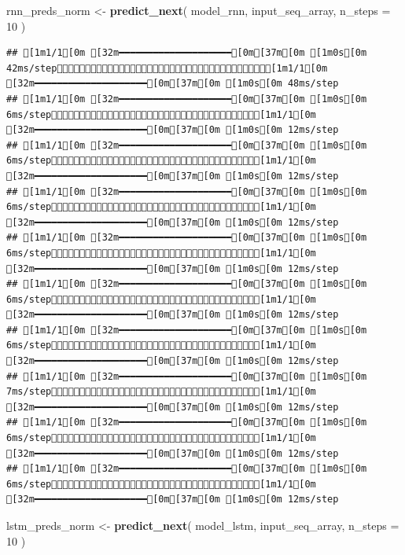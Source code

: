 \documentclass[
]{article}
\newenvironment{Shaded}{\begin{snugshade}}{\end{snugshade}}
\newcommand{\AttributeTok}[1]{\textcolor[rgb]{0.13,0.29,0.53}{#1}}
\newcommand{\DecValTok}[1]{\textcolor[rgb]{0.00,0.00,0.81}{#1}}
\newcommand{\FunctionTok}[1]{\textcolor[rgb]{0.13,0.29,0.53}{\textbf{#1}}}
\newcommand{\NormalTok}[1]{#1}
\newcommand{\OtherTok}[1]{\textcolor[rgb]{0.56,0.35,0.01}{#1}}
\begin{document}
\begin{Shaded}
\begin{Highlighting}[]
\NormalTok{rnn\_preds\_norm }\OtherTok{\textless{}{-}} \FunctionTok{predict\_next}\NormalTok{(}
\NormalTok{  model\_rnn, }
\NormalTok{  input\_seq\_array, }
  \AttributeTok{n\_steps =} \DecValTok{10}
\NormalTok{)}
\end{Highlighting}
\end{Shaded}

\begin{verbatim}
## [1m1/1[0m [32m━━━━━━━━━━━━━━━━━━━━[0m[37m[0m [1m0s[0m 42ms/step[1m1/1[0m [32m━━━━━━━━━━━━━━━━━━━━[0m[37m[0m [1m0s[0m 48ms/step
## [1m1/1[0m [32m━━━━━━━━━━━━━━━━━━━━[0m[37m[0m [1m0s[0m 6ms/step[1m1/1[0m [32m━━━━━━━━━━━━━━━━━━━━[0m[37m[0m [1m0s[0m 12ms/step
## [1m1/1[0m [32m━━━━━━━━━━━━━━━━━━━━[0m[37m[0m [1m0s[0m 6ms/step[1m1/1[0m [32m━━━━━━━━━━━━━━━━━━━━[0m[37m[0m [1m0s[0m 12ms/step
## [1m1/1[0m [32m━━━━━━━━━━━━━━━━━━━━[0m[37m[0m [1m0s[0m 6ms/step[1m1/1[0m [32m━━━━━━━━━━━━━━━━━━━━[0m[37m[0m [1m0s[0m 12ms/step
## [1m1/1[0m [32m━━━━━━━━━━━━━━━━━━━━[0m[37m[0m [1m0s[0m 6ms/step[1m1/1[0m [32m━━━━━━━━━━━━━━━━━━━━[0m[37m[0m [1m0s[0m 12ms/step
## [1m1/1[0m [32m━━━━━━━━━━━━━━━━━━━━[0m[37m[0m [1m0s[0m 6ms/step[1m1/1[0m [32m━━━━━━━━━━━━━━━━━━━━[0m[37m[0m [1m0s[0m 12ms/step
## [1m1/1[0m [32m━━━━━━━━━━━━━━━━━━━━[0m[37m[0m [1m0s[0m 6ms/step[1m1/1[0m [32m━━━━━━━━━━━━━━━━━━━━[0m[37m[0m [1m0s[0m 12ms/step
## [1m1/1[0m [32m━━━━━━━━━━━━━━━━━━━━[0m[37m[0m [1m0s[0m 7ms/step[1m1/1[0m [32m━━━━━━━━━━━━━━━━━━━━[0m[37m[0m [1m0s[0m 12ms/step
## [1m1/1[0m [32m━━━━━━━━━━━━━━━━━━━━[0m[37m[0m [1m0s[0m 6ms/step[1m1/1[0m [32m━━━━━━━━━━━━━━━━━━━━[0m[37m[0m [1m0s[0m 12ms/step
## [1m1/1[0m [32m━━━━━━━━━━━━━━━━━━━━[0m[37m[0m [1m0s[0m 6ms/step[1m1/1[0m [32m━━━━━━━━━━━━━━━━━━━━[0m[37m[0m [1m0s[0m 12ms/step
\end{verbatim}

\begin{Shaded}
\begin{Highlighting}[]
\NormalTok{lstm\_preds\_norm }\OtherTok{\textless{}{-}} \FunctionTok{predict\_next}\NormalTok{(}
\NormalTok{  model\_lstm, }
\NormalTok{  input\_seq\_array, }
  \AttributeTok{n\_steps =} \DecValTok{10}
\NormalTok{)}
\end{Highlighting}
\end{Shaded}
\end{document}
